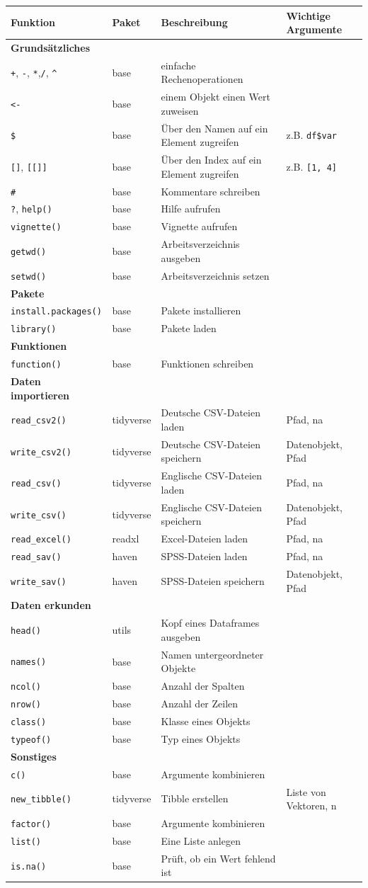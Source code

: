 \documentclass[
]{book}
\begin{document}
\begin{longtable}[]{@{}llll@{}}
\toprule
Funktion & Paket & Beschreibung & Wichtige Argumente\tabularnewline
\midrule
\endhead
\textbf{Grundsätzliches} & & &\tabularnewline
\texttt{+}, \texttt{-}, \texttt{*},\texttt{/}, \texttt{\^{}} & base & einfache Rechenoperationen &\tabularnewline
\texttt{\textless{}-} & base & einem Objekt einen Wert zuweisen &\tabularnewline
\texttt{\$} & base & Über den Namen auf ein Element zugreifen & z.B. \texttt{df\$var}\tabularnewline
\texttt{{[}{]}}, \texttt{{[}{[}{]}{]}} & base & Über den Index auf ein Element zugreifen & z.B. \texttt{{[}1,\ 4{]}}\tabularnewline
\texttt{\#} & base & Kommentare schreiben &\tabularnewline
\texttt{?}, \texttt{help()} & base & Hilfe aufrufen &\tabularnewline
\texttt{vignette()} & base & Vignette aufrufen &\tabularnewline
\texttt{getwd()} & base & Arbeitsverzeichnis ausgeben &\tabularnewline
\texttt{setwd()} & base & Arbeitsverzeichnis setzen &\tabularnewline
\textbf{Pakete} & & &\tabularnewline
\texttt{install.packages()} & base & Pakete installieren &\tabularnewline
\texttt{library()} & base & Pakete laden &\tabularnewline
\textbf{Funktionen} & & &\tabularnewline
\texttt{function()} & base & Funktionen schreiben &\tabularnewline
\textbf{Daten importieren} & & &\tabularnewline
\texttt{read\_csv2()} & tidyverse & Deutsche CSV-Dateien laden & Pfad, na\tabularnewline
\texttt{write\_csv2()} & tidyverse & Deutsche CSV-Dateien speichern & Datenobjekt, Pfad\tabularnewline
\texttt{read\_csv()} & tidyverse & Englische CSV-Dateien laden & Pfad, na\tabularnewline
\texttt{write\_csv()} & tidyverse & Englische CSV-Dateien speichern & Datenobjekt, Pfad\tabularnewline
\texttt{read\_excel()} & readxl & Excel-Dateien laden & Pfad, na\tabularnewline
\texttt{read\_sav()} & haven & SPSS-Dateien laden & Pfad, na\tabularnewline
\texttt{write\_sav()} & haven & SPSS-Dateien speichern & Datenobjekt, Pfad\tabularnewline
\textbf{Daten erkunden} & & &\tabularnewline
\texttt{head()} & utils & Kopf eines Dataframes ausgeben &\tabularnewline
\texttt{names()} & base & Namen untergeordneter Objekte &\tabularnewline
\texttt{ncol()} & base & Anzahl der Spalten &\tabularnewline
\texttt{nrow()} & base & Anzahl der Zeilen &\tabularnewline
\texttt{class()} & base & Klasse eines Objekts &\tabularnewline
\texttt{typeof()} & base & Typ eines Objekts &\tabularnewline
\textbf{Sonstiges} & & &\tabularnewline
\texttt{c()} & base & Argumente kombinieren &\tabularnewline
\texttt{new\_tibble()} & tidyverse & Tibble erstellen & Liste von Vektoren, n\tabularnewline
\texttt{factor()} & base & Argumente kombinieren &\tabularnewline
\texttt{list()} & base & Eine Liste anlegen &\tabularnewline
\texttt{is.na()} & base & Prüft, ob ein Wert fehlend ist &\tabularnewline
\bottomrule
\end{longtable}
\end{document}
